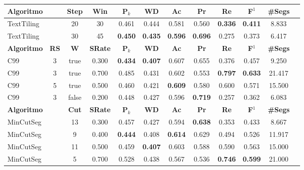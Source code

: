 


\begin{table}[!h]
	\centering
	\begin{tabular}{|l||c|c|c|c|c|c|c|c|c|c|c|} \hline

		\textbf{Algoritmo} && 
		\textbf{Step} &
		\textbf{Win} & 
		\textbf{P$_k$} & 
		\textbf{WD} & 
		\textbf{Ac} & 
		\textbf{Pr} & 
		\textbf{Re} &
		\textbf{F$^1$} &
		\textbf{\#Segs} \\	\hline

TextTiling && 20 & 30 & 0.461 & 0.444 & 0.581 & 0.560 & \cellcolor{gray!20} \textbf{0.336} & \cellcolor{gray!20} \textbf{0.411} & 8.833  \\ \hline 
TextTiling && 30 & 45 & \cellcolor{gray!20} \textbf{0.450} & \cellcolor{gray!20} \textbf{0.435} & \cellcolor{gray!20} \textbf{0.596} & \cellcolor{gray!20} \textbf{0.696} & 0.275 & 0.373 & 6.417  \\ \hline 

\hline
		\textbf{Algoritmo} &
		\textbf{RS} &
		\textbf{W} & 
		\textbf{SRate}& 
		\textbf{P$_k$} & 
		\textbf{WD} & 
		\textbf{Ac} & 
		\textbf{Pr} & 
		\textbf{Re} &
		\textbf{F$^1$} &
		\textbf{\#Segs} \\	\hline

C99 & 3 & true  &0.300 &  \cellcolor{gray!20} \textbf{0.434} & \cellcolor{gray!20} \textbf{0.407} & 0.607 & 0.655 & 0.376 & 0.457 & 9.250  \\ \hline 
C99 & 3 & true  &0.700 &  0.485 & 0.431 & 0.602 & 0.553 & \cellcolor{gray!20} \textbf{0.797} & \cellcolor{gray!20} \textbf{0.633} & 21.417  \\ \hline 
C99 & 5 & true  &0.500 &  0.460 & 0.421 & \cellcolor{gray!20} \textbf{0.609} & 0.580 & 0.600 & 0.571 & 15.500  \\ \hline 
C99 & 3 & false &0.200 &  0.448 & 0.427 & 0.596 & \cellcolor{gray!20} \textbf{0.719} & 0.257 & 0.362 & 6.083  \\ \hline 


\hline
		\textbf{Algoritmo} && 
		\textbf{Cut} & 
		\textbf{SRate} &
		\textbf{P$_k$} & 
		\textbf{WD} & 
		\textbf{Ac} & 
		\textbf{Pr} & 
		\textbf{Re} &
		\textbf{F$^1$} &
		\textbf{\#Segs} \\	\hline


MinCutSeg && 13 & 0.300 & 0.457 & 0.427 & 0.594 & \cellcolor{gray!20} \textbf{0.638} & 0.353 & 0.433 & 8.667  \\ \hline 
MinCutSeg && 9  & 0.400 & \cellcolor{gray!20} \textbf{0.444} & 0.408 & \cellcolor{gray!20} \textbf{0.614} & 0.629 & 0.494 & 0.526 & 11.917  \\ \hline 
MinCutSeg && 11 & 0.500 & 0.459 & \cellcolor{gray!20} \textbf{0.407} & 0.603 & 0.588 & 0.590 & 0.563 & 15.000  \\ \hline 
MinCutSeg && 5  & 0.700 & 0.528 & 0.438 & 0.567 & 0.536 & \cellcolor{gray!20} \textbf{0.746} & \cellcolor{gray!20} \textbf{0.599} & 21.000  \\ \hline 



\end{tabular}
\end{table}
